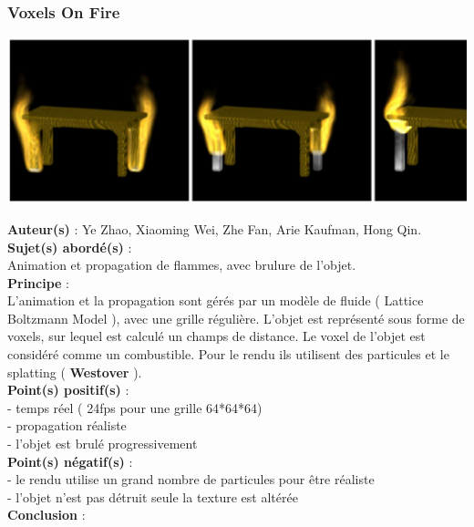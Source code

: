 \documentclass[a4paper,10pt]{article}
\begin{document}
\subsubsection{Voxels On Fire}
    \begin{center}
	\includegraphics[scale=0.5]{Voxel.ps}
    \end{center}
\textbf{Auteur(s)} : Ye Zhao, Xiaoming Wei, Zhe Fan, Arie Kaufman, Hong Qin.\\
\textbf{Sujet(s) abordé(s)} : \\  Animation et propagation de flammes, avec brulure de l'objet.\\
\textbf{Principe} :\\ L'animation et la propagation sont gérés par un modèle de fluide ( Lattice Boltzmann Model ), avec une grille régulière. L'objet est représenté sous forme de voxels, sur lequel est calculé un champs de distance. Le voxel de l'objet est considéré comme un combustible. Pour le rendu ils utilisent des particules et le splatting ( \textbf{Westover} ).\\
\textbf{Point(s) positif(s)} :\\
    - temps réel ( 24fps pour une grille 64*64*64)\\
    - propagation réaliste\\
    - l'objet est brulé progressivement\\
\textbf{Point(s) négatif(s)} :\\
    - le rendu utilise un grand nombre de particules pour être réaliste\\
    - l'objet n'est pas détruit seule la texture est altérée\\
\textbf{Conclusion} :\\
\end{document}
